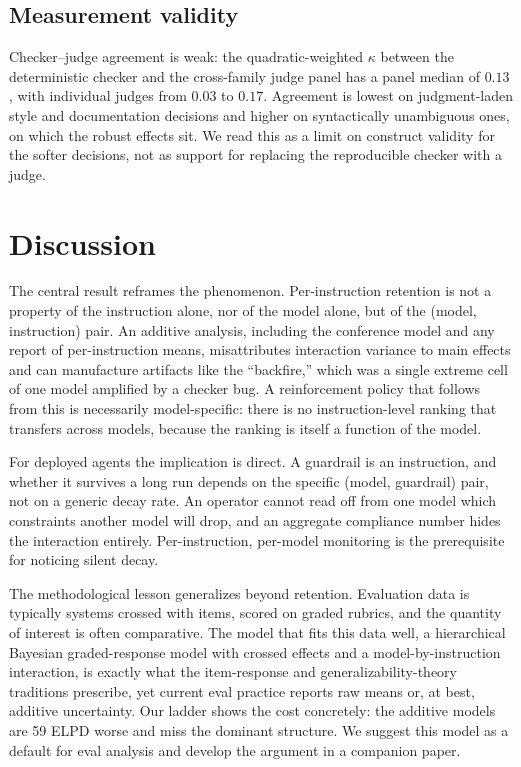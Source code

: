 \documentclass{llncs}
\begin{document}
\subsection{Measurement validity}
\label{sec:validity}
Checker--judge agreement is weak: the quadratic-weighted $\kappa$ between the
deterministic checker and the cross-family judge panel has a panel median of
$0.13$, with individual judges from $0.03$ to $0.17$. Agreement is lowest on
judgment-laden style and documentation decisions and higher on syntactically
unambiguous ones, on which the robust effects sit. We read this as a limit on
construct validity for the softer decisions, not as support for replacing the
reproducible checker with a judge.

\section{Discussion}

The central result reframes the phenomenon. Per-instruction retention is not
a property of the instruction alone, nor of the model alone, but of the
(model, instruction) pair. An additive analysis, including the conference
model and any report of per-instruction means, misattributes interaction
variance to main effects and can manufacture artifacts like the
``backfire,'' which was a single extreme cell of one model amplified by a
checker bug. A reinforcement policy that follows from this is necessarily
model-specific: there is no instruction-level ranking that transfers across
models, because the ranking is itself a function of the model.

For deployed agents the implication is direct. A guardrail is an instruction,
and whether it survives a long run depends on the specific (model, guardrail)
pair, not on a generic decay rate. An operator cannot read off from one model
which constraints another model will drop, and an aggregate compliance number
hides the interaction entirely. Per-instruction, per-model monitoring is the
prerequisite for noticing silent decay.

The methodological lesson generalizes beyond retention. Evaluation data is
typically systems crossed with items, scored on graded rubrics, and the
quantity of interest is often comparative. The model that fits this data
well, a hierarchical Bayesian graded-response model with crossed effects and
a model-by-instruction interaction, is exactly what the item-response and
generalizability-theory traditions prescribe, yet current eval practice
reports raw means or, at best, additive uncertainty. Our ladder shows the
cost concretely: the additive models are 59 ELPD worse and miss the dominant
structure. We suggest this model as a default for eval analysis and develop
the argument in a companion paper.
\end{document}
